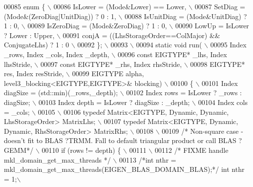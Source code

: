 \begin{DoxyCode}
00085 \textcolor{preprocessor}{  enum \{ \(\backslash\)}
00086 \textcolor{preprocessor}{    IsLower = (Mode&Lower) == Lower, \(\backslash\)}
00087 \textcolor{preprocessor}{    SetDiag = (Mode&(ZeroDiag|UnitDiag)) ? 0 : 1, \(\backslash\)}
00088 \textcolor{preprocessor}{    IsUnitDiag  = (Mode&UnitDiag) ? 1 : 0, \(\backslash\)}
00089 \textcolor{preprocessor}{    IsZeroDiag  = (Mode&ZeroDiag) ? 1 : 0, \(\backslash\)}
00090 \textcolor{preprocessor}{    LowUp = IsLower ? Lower : Upper, \(\backslash\)}
00091 \textcolor{preprocessor}{    conjA = ((LhsStorageOrder==ColMajor) && ConjugateLhs) ? 1 : 0 \(\backslash\)}
00092 \textcolor{preprocessor}{  \}; \(\backslash\)}
00093 \textcolor{preprocessor}{\(\backslash\)}
00094 \textcolor{preprocessor}{  static void run( \(\backslash\)}
00095 \textcolor{preprocessor}{    Index \_rows, Index \_cols, Index \_depth, \(\backslash\)}
00096 \textcolor{preprocessor}{    const EIGTYPE* \_lhs, Index lhsStride, \(\backslash\)}
00097 \textcolor{preprocessor}{    const EIGTYPE* \_rhs, Index rhsStride, \(\backslash\)}
00098 \textcolor{preprocessor}{    EIGTYPE* res,        Index resStride, \(\backslash\)}
00099 \textcolor{preprocessor}{    EIGTYPE alpha, level3\_blocking<EIGTYPE,EIGTYPE>& blocking) \(\backslash\)}
00100 \textcolor{preprocessor}{  \{ \(\backslash\)}
00101 \textcolor{preprocessor}{   Index diagSize  = (std::min)(\_rows,\_depth); \(\backslash\)}
00102 \textcolor{preprocessor}{   Index rows      = IsLower ? \_rows : diagSize; \(\backslash\)}
00103 \textcolor{preprocessor}{   Index depth     = IsLower ? diagSize : \_depth; \(\backslash\)}
00104 \textcolor{preprocessor}{   Index cols      = \_cols; \(\backslash\)}
00105 \textcolor{preprocessor}{\(\backslash\)}
00106 \textcolor{preprocessor}{   typedef Matrix<EIGTYPE, Dynamic, Dynamic, LhsStorageOrder> MatrixLhs; \(\backslash\)}
00107 \textcolor{preprocessor}{   typedef Matrix<EIGTYPE, Dynamic, Dynamic, RhsStorageOrder> MatrixRhs; \(\backslash\)}
00108 \textcolor{preprocessor}{\(\backslash\)}
00109 \textcolor{preprocessor}{}\textcolor{comment}{/* Non-square case - doesn't fit to BLAS ?TRMM. Fall to default triangular product or call BLAS ?GEMM*/}\textcolor{preprocessor}{ \(\backslash\)}
00110 \textcolor{preprocessor}{   if (rows != depth) \{ \(\backslash\)}
00111 \textcolor{preprocessor}{\(\backslash\)}
00112 \textcolor{preprocessor}{     }\textcolor{comment}{/* FIXME handle mkl\_domain\_get\_max\_threads */}\textcolor{preprocessor}{ \(\backslash\)}
00113 \textcolor{preprocessor}{     }\textcolor{comment}{/*int nthr = mkl\_domain\_get\_max\_threads(EIGEN\_BLAS\_DOMAIN\_BLAS);*/}\textcolor{preprocessor}{ int nthr = 1;\(\backslash\)}

\end{DoxyCode}
